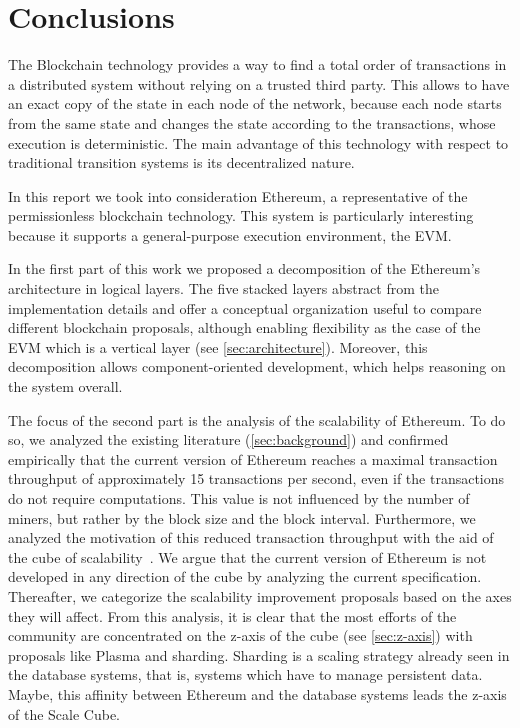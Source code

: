 \section{Conclusions}
\label{sec:conclusions}
The Blockchain technology provides a way to find a total order of transactions
in a distributed system without relying on a trusted third party. This allows
to have an exact copy of the state in each node of the network, because each
node starts from the same state and changes the state according to the
transactions, whose execution is deterministic. The main advantage of this
technology with respect to traditional transition systems is its decentralized
nature.

In this report we took into consideration Ethereum, a representative of the
permissionless blockchain technology. This system is particularly interesting
because it supports a general-purpose execution environment, the EVM.

In the first part of this work we proposed a decomposition of the Ethereum's
architecture in logical layers. The five stacked layers abstract from the
implementation details and offer a conceptual organization useful to compare
different blockchain proposals, although enabling flexibility as the case of the
EVM which is a vertical layer (see \autoref{sec:architecture}). Moreover, this
decomposition allows component-oriented development, which helps reasoning on the
system overall.

The focus of the second part is the analysis of the scalability of Ethereum. To
do so, we analyzed the existing literature (\autoref{sec:background}) and
confirmed empirically that the current version of Ethereum reaches a maximal
transaction throughput of approximately 15 transactions per second, even if the
transactions do not require computations. This value is not influenced by the
number of miners, but rather by the block size and the block interval.
Furthermore, we analyzed the motivation of this reduced transaction throughput
with the aid of the cube of scalability~\cite{bib:art-of-scalability}. We argue
that the current version of Ethereum is not developed in any direction of the
cube by analyzing the current specification. Thereafter, we categorize the
scalability improvement proposals based on the axes they will affect. From this
analysis, it is clear that the most efforts of the community are concentrated on
the z-axis of the cube (see \autoref{sec:z-axis}) with proposals like Plasma and
sharding. Sharding is a scaling strategy already seen in the database systems,
that is, systems which have to manage persistent data. Maybe, this affinity
between Ethereum and the database systems leads the z-axis of the Scale Cube.

